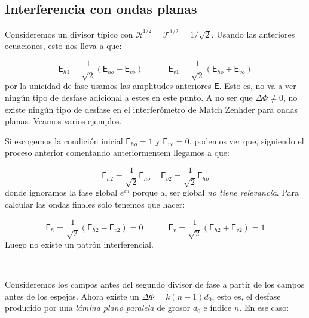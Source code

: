 \documentclass[12pt,a4paper]{book}
\numberwithin{equation}{section}
\numberwithin{figure}{section}
\newcommand{\tquad}{\quad \quad \quad}
\newcommand{\parentesis}[1]{\left( #1  \right)}
\newcommand{\1}{_{(1)}}
\newcommand{\2}{_{(2)}}
\newcommand{\Esf}{\mathsf{E}}
\theoremstyle{definition}
\begin{document}
\subsection{Interferencia con ondas planas}

Consideremos un divisor típico con $\mathcal{R}^{1/2}=\mathcal{T}^{1/2}=1/\sqrt{2}$. Usando las anteriores ecuaciones, esto nos lleva a que:

\begin{equation}
\mathsf{E}_{h1} = \frac{1}{\sqrt{2}} \parentesis{\mathsf{E}_{ho}-\mathsf{E}_{vo}} \tquad \mathsf{E}_{v1} = \frac{1}{\sqrt{2}} \parentesis{\mathsf{E}_{ho}+\mathsf{E}_{vo}}
\end{equation}
por la unicidad de fase usamos las amplitudes anteriores $\mathsf{E}$. Esto es, no va a ver ningún tipo de desfase adicional a estes en este punto. A no ser que $\Delta \Phi \neq 0$, no existe ningún tipo de desfase en el interferómetro de Match Zenhder para ondas planas. Veamos varios ejemplos. \\


\hrulefill

Si escogemos la condición inicial $\mathsf{E}_{ho}=1$ y $\mathsf{E}_{vo}=0$, podemos ver que, siguiendo el proceso anterior comentando anteriormentem llegamos a que:

\begin{equation}
\mathsf{E}_{h2}=\frac{1}{\sqrt{2}} \mathsf{E}_{ho} \quad \ \mathsf{E}_{v2} = \frac{1}{\sqrt{2}} \mathsf{E}_{ho} 
\end{equation}
donde ignoramos la fase global $e^{i\pi}$ porque al ser global \textit{no tiene relevancia}. Para calcular las ondas finales solo tenemos que hacer:

\begin{equation}
\Esf_h = \frac{1}{\sqrt{2}} (\Esf_{h2} - \Esf_{v2}) = 0 \tquad
\Esf_v = \frac{1}{\sqrt{2}} (\Esf_{h2} + \Esf_{v2}) = 1
\end{equation}
Luego no existe un patrón interferencial. 

\hrulefill \\


\hrulefill

Consideremos los campos antes del segundo divisor de fase a partir de los campos antes de los espejos. Ahora existe un $\Delta \Phi = k(n-1)d_0$, esto es, el desfase producido por una \textit{lámina plano paralela} de grosor $d_0$ e índice $n$. En ese caso:
\end{document}
